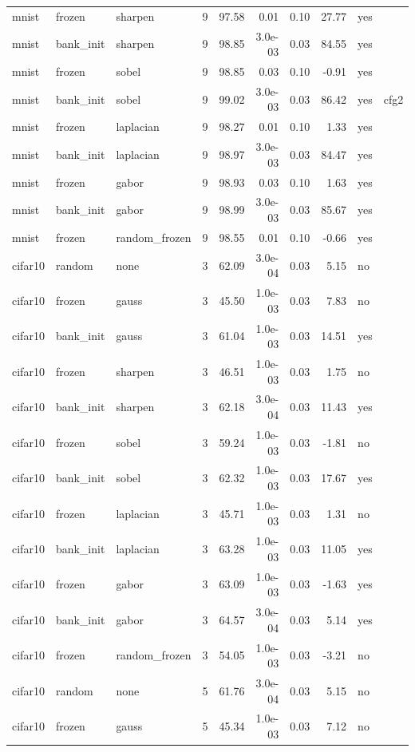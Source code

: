 \begin{table}[htbp]
{\begin{tabular}{@{}lllrrrrrll@{}}
mnist & frozen & sharpen & 9 & 97.58 & 0.01 & 0.10 & 27.77 & yes &  \\
mnist & bank\_init & sharpen & 9 & 98.85 & 3.0e-03 & 0.03 & 84.55 & yes &  \\
mnist & frozen & sobel & 9 & 98.85 & 0.03 & 0.10 & -0.91 & yes &  \\
mnist & bank\_init & sobel & 9 & 99.02 & 3.0e-03 & 0.03 & 86.42 & yes & cfg2 \\
mnist & frozen & laplacian & 9 & 98.27 & 0.01 & 0.10 & 1.33 & yes &  \\
mnist & bank\_init & laplacian & 9 & 98.97 & 3.0e-03 & 0.03 & 84.47 & yes &  \\
mnist & frozen & gabor & 9 & 98.93 & 0.03 & 0.10 & 1.63 & yes &  \\
mnist & bank\_init & gabor & 9 & 98.99 & 3.0e-03 & 0.03 & 85.67 & yes &  \\
mnist & frozen & random\_frozen & 9 & 98.55 & 0.01 & 0.10 & -0.66 & yes &  \\
cifar10 & random & none & 3 & 62.09 & 3.0e-04 & 0.03 & 5.15 & no &  \\
cifar10 & frozen & gauss & 3 & 45.50 & 1.0e-03 & 0.03 & 7.83 & no &  \\
cifar10 & bank\_init & gauss & 3 & 61.04 & 1.0e-03 & 0.03 & 14.51 & yes &  \\
cifar10 & frozen & sharpen & 3 & 46.51 & 1.0e-03 & 0.03 & 1.75 & no &  \\
cifar10 & bank\_init & sharpen & 3 & 62.18 & 3.0e-04 & 0.03 & 11.43 & yes &  \\
cifar10 & frozen & sobel & 3 & 59.24 & 1.0e-03 & 0.03 & -1.81 & no &  \\
cifar10 & bank\_init & sobel & 3 & 62.32 & 1.0e-03 & 0.03 & 17.67 & yes &  \\
cifar10 & frozen & laplacian & 3 & 45.71 & 1.0e-03 & 0.03 & 1.31 & no &  \\
cifar10 & bank\_init & laplacian & 3 & 63.28 & 1.0e-03 & 0.03 & 11.05 & yes &  \\
cifar10 & frozen & gabor & 3 & 63.09 & 1.0e-03 & 0.03 & -1.63 & yes &  \\
cifar10 & bank\_init & gabor & 3 & 64.57 & 3.0e-04 & 0.03 & 5.14 & yes &  \\
cifar10 & frozen & random\_frozen & 3 & 54.05 & 1.0e-03 & 0.03 & -3.21 & no &  \\
cifar10 & random & none & 5 & 61.76 & 3.0e-04 & 0.03 & 5.15 & no &  \\
cifar10 & frozen & gauss & 5 & 45.34 & 1.0e-03 & 0.03 & 7.12 & no &  \\

\end{tabular}}
\end{table}
